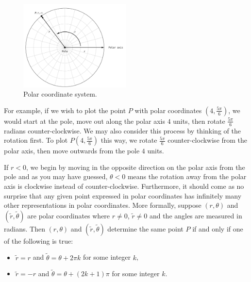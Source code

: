 \begin{figure}
	\begin{center}
			\includegraphics[width=0.5\textwidth]{fig_parametric_1}
	\caption{Polar coordinate system. }
	\label{fig_parametric_1}
	\end{center}
\end{figure}

For example, if we wish to plot the point $P$ with polar coordinates $\left(4, \frac{5\pi}{6}\right)$, we would start at the pole, move out along the polar axis $4$ units, then rotate $\frac{5\pi}{6}$ radians counter-clockwise. We may also consider this process by thinking of the rotation first. To plot $P\left(4,\frac{5\pi}{6}\right)$ this way,  we rotate  $\frac{5\pi}{6}$ counter-clockwise from the polar axis, then move outwards from the pole $4$ units.  

If $r < 0$, we begin by moving in the opposite direction on the polar axis from the pole and as you may have guessed, $\theta < 0$ means the rotation away from the polar axis is clockwise instead of counter-clockwise. Furthermore, it should come as no surprise that any given point expressed in polar coordinates has infinitely many other representations in polar coordinates.  More formally, suppose $\left(r, \theta\right)$ and $\left(\widetilde{r}, \widetilde{\theta}\right)$ are polar coordinates where $r \neq 0$, $\widetilde{r} \neq 0$ and the angles are measured in radians.  Then $\left(r, \theta\right)$ and $\left(\widetilde{r}, \widetilde{\theta}\right)$  determine the same point $P$ if and only if one of the following is true:
 
 \begin{itemize}
 
 \item  $\widetilde{r} = r$ and $\widetilde{\theta} =  \theta + 2\pi k$ for some integer $k$,
 
 \item  $\widetilde{r} = -r$ and $\widetilde{\theta} =  \theta + (2k + 1) \pi$ for some integer $k$.
 
 \end{itemize}

